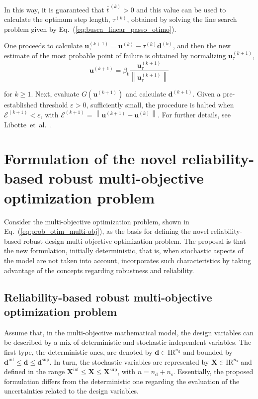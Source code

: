 \documentclass[final,5p,times,twocolumn,numbers]{elsarticle}
\newcommand{\norm}[1]{\left\lVert#1\right\rVert}
\begin{document}
\noindent In this way, it is guaranteed that $ \bar{t}^{\, \left( k \right)} > 0 $ and this value can be used to calculate the optimum step length, $ \tau^{\left( k \right)} $, obtained by solving the line search problem given by Eq.~(\ref{eq:busca_linear_passo_otimo}).

One proceeds to calculate $ \mathbf{u}_{\tau}^{\left( k + 1 \right)} = \mathbf{u}^{\left( k \right)} - \tau^{\left( k \right)} \mathbf{d}^{\left( k \right)} $, and then the new estimate of the most probable point of failure is obtained by normalizing $ \mathbf{u}_{\tau}^{\left( k + 1 \right)} $,
%
\begin{equation}
\mathbf{u}^{\left( k + 1 \right)} = \beta_{\mathrm{t}} \dfrac{\mathbf{u}_{\tau}^{\left( k + 1 \right)}}{\norm{\mathbf{u}_{\tau}^{\left( k + 1 \right)}}}
\end{equation}

\noindent for $ k \geq 1 $. Next, evaluate $ G \left( \mathbf{u}^{\left( k + 1 \right)} \right) $ and calculate $ \mathbf{d}^{\left( k + 1 \right)} $. Given a pre-established threshold $ \varepsilon > 0 $, sufficiently small, the procedure is halted when $ \mathcal{E}^{\left( k + 1 \right)} < \varepsilon $, with $ \mathcal{E}^{\left( k + 1 \right)} = \norm{\mathbf{u}^{\left( k + 1 \right)} - \mathbf{u}^{\left( k \right)}} $. For further details, see Libotte~et~al.~\cite{bib:libotte2020}.

\section{Formulation of the novel reliability-based robust multi-objective optimization problem} \label{sec:formulation_problem}

Consider the multi-objective optimization problem, shown in Eq.~(\ref{eq:prob_otim_multi-obj}), as the basis for defining the novel reliability-based robust design multi-objective optimization problem. The proposal is that the new formulation, initially deterministic, that is, when stochastic aspects of the model are not taken into account, incorporates such characteristics by taking advantage of the concepts regarding robustness and reliability.

\subsection{Reliability-based robust multi-objective optimization problem}

Assume that, in the multi-objective mathematical model, the design variables can be described by a mix of deterministic and stochastic independent variables. The first type, the deterministic ones, are denoted by $ \mathbf{d} \in \mathrm{I\!R}^{n_{\mathrm{d}}} $ and bounded by $ \mathbf{d}^{\mathrm{inf}} \leq \mathbf{d} \leq \mathbf{d}^{\mathrm{sup}} $. In turn, the stochastic variables are represented by $ \mathbf{X} \in \mathrm{I\!R}^{n_{\mathrm{s}}} $ and defined in the range $ \mathbf{X}^{\mathrm{inf}} \leq \mathbf{X} \leq \mathbf{X}^{\mathrm{sup}} $, with $ n = n_{\mathrm{d}} + n_{\mathrm{s}} $. Essentially, the proposed formulation differs from the deterministic one regarding the evaluation of the uncertainties related to the design variables.
\end{document}
